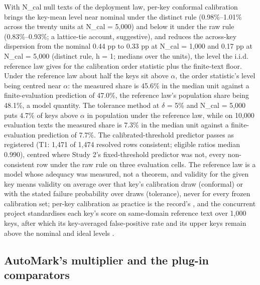 \documentclass[11pt,letterpaper]{article}
\begin{document}
With N\_cal null texts of the deployment law, per-key conformal calibration brings the key-mean level near nominal under the distinct rule (0.98\%--1.01\% across the twenty units at N\_cal = 5,000) and below it under the raw rule (0.83\%--0.93\%; a lattice-tie account, suggestive), and reduces the across-key dispersion from the nominal 0.44 pp to 0.33 pp at N\_cal = 1,000 and 0.17 pp at N\_cal = 5,000 (distinct rule, h = 1; medians over the units), the level the i.i.d. reference law gives for the calibration order statistic plus the finite-text floor. Under the reference law about half the keys sit above \ensuremath{\alpha}, the order statistic's level being centred near \ensuremath{\alpha}: the measured share is 45.6\% in the median unit against a finite-evaluation prediction of 47.0\%, the reference law's population share being 48.1\%, a model quantity. The tolerance method at \ensuremath{\delta} = 5\% and N\_cal = 5,000 puts 4.7\% of keys above \ensuremath{\alpha} in population under the reference law, while on 10,000 evaluation texts the measured share is 7.3\% in the median unit against a finite-evaluation prediction of 7.7\%. The calibrated-threshold predictor passes as registered (T1: 1,471 of 1,474 resolved rows consistent; eligible ratios median 0.990), centred where Study 2's fixed-threshold predictor was not, every non-consistent row under the raw rule on three evaluation cells. The reference law is a model whose adequacy was measured, not a theorem, and validity for the given key means validity on average over that key's calibration draw (conformal) or with the stated failure probability over draws (tolerance), never for every frozen calibration set; per-key calibration as practice is the record's \citep{vovk2012conditional, xie2025classroom, aremu2026activation, genhatharan2026nominal, delbianco2026compliance}, and the concurrent project standardises each key's score on same-domain reference text over 1,000 keys, after which its key-averaged false-positive rate and its upper keys remain above the nominal and ideal levels \citep{yukhimchuk2026keylottery}.

\hypertarget{automarks-multiplier-and-the-plug-in-comparators}{%
\subsection{AutoMark's multiplier and the plug-in comparators}\label{automarks-multiplier-and-the-plug-in-comparators}}
\end{document}
